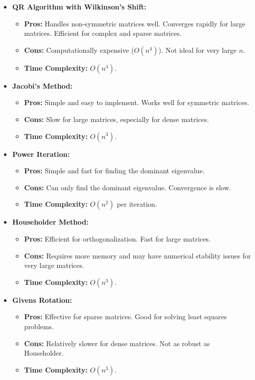 \documentclass[journal]{IEEEtran}
\begin{document}
\begin{itemize}
    \item \textbf{QR Algorithm with Wilkinson's Shift:}
    \begin{itemize}
        \item \textbf{Pros:} Handles non-symmetric matrices well. Converges rapidly for large matrices. Efficient for complex and sparse matrices.
        \item \textbf{Cons:} Computationally expensive ($O(n^4)$). Not ideal for very large $n$.
        \item \textbf{Time Complexity:} $O(n^4)$.
    \end{itemize}
    
    \item \textbf{Jacobi's Method:}
    \begin{itemize}
        \item \textbf{Pros:} Simple and easy to implement. Works well for symmetric matrices.
        \item \textbf{Cons:} Slow for large matrices, especially for dense matrices.
        \item \textbf{Time Complexity:} $O(n^3)$.
    \end{itemize}
    
    \item \textbf{Power Iteration:}
    \begin{itemize}
        \item \textbf{Pros:} Simple and fast for finding the dominant eigenvalue.
        \item \textbf{Cons:} Can only find the dominant eigenvalue. Convergence is slow.
        \item \textbf{Time Complexity:} $O(n^2)$ per iteration.
    \end{itemize}

    \item \textbf{Householder Method:}
    \begin{itemize}
        \item \textbf{Pros:} Efficient for orthogonalization. Fast for large matrices.
        \item \textbf{Cons:} Requires more memory and may have numerical stability issues for very large matrices.
        \item \textbf{Time Complexity:} $O(n^3)$.
    \end{itemize}
    
    \item \textbf{Givens Rotation:}
    \begin{itemize}
        \item \textbf{Pros:} Effective for sparse matrices. Good for solving least squares problems.
        \item \textbf{Cons:} Relatively slower for dense matrices. Not as robust as Householder.
        \item \textbf{Time Complexity:} $O(n^3)$.
    \end{itemize}
\end{itemize}
\end{document}
